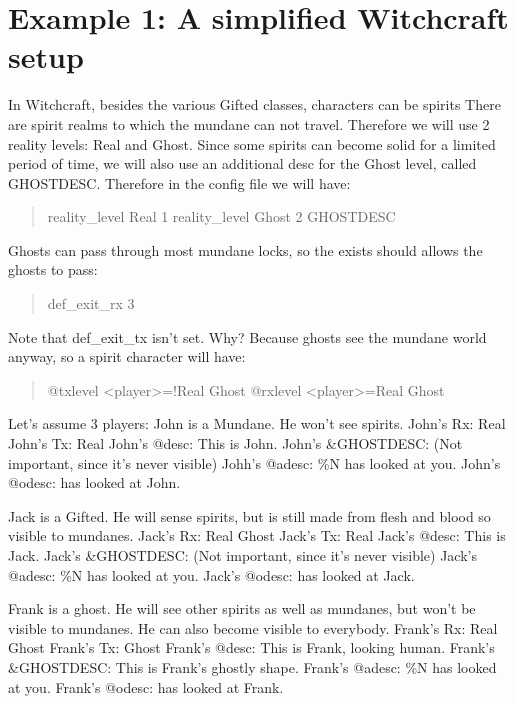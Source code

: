 \documentclass[letterpaper,10pt,english]{sphinxmanual}
\begin{document}
\section{Example 1: A simplified Witchcraft setup}
\label{\detokenize{19-reality:example-1-a-simplified-witchcraft-setup}}
\sphinxAtStartPar
In Witchcraft, besides the various Gifted classes, characters can be spirits
There are spirit realms to which the mundane can not travel. Therefore we
will use 2 reality levels: Real and Ghost. Since some spirits can become
solid for a limited period of time, we will also use an additional desc for
the Ghost level, called GHOSTDESC. Therefore in the config file we will
have:
\begin{quote}

\sphinxAtStartPar
reality\_level Real 1
reality\_level Ghost 2 GHOSTDESC
\end{quote}

\sphinxAtStartPar
Ghosts can pass through most mundane locks, so the exists should allows the
ghosts to pass:
\begin{quote}

\sphinxAtStartPar
def\_exit\_rx 3
\end{quote}

\sphinxAtStartPar
Note that def\_exit\_tx isn’t set. Why? Because ghosts see the mundane world
anyway, so a spirit character will have:
\begin{quote}

\sphinxAtStartPar
@txlevel \textless{}player\textgreater{}=!Real Ghost
@rxlevel \textless{}player\textgreater{}=Real Ghost
\end{quote}

\sphinxAtStartPar
Let’s assume 3 players:
John is a Mundane. He won’t see spirits.
John’s Rx: Real
John’s Tx: Real
John’s @desc: This is John.
John’s \&GHOSTDESC: (Not important, since it’s never visible)
Johh’s @adesc: \%N has looked at you.
John’s @odesc: has looked at John.

\sphinxAtStartPar
Jack is a Gifted. He will sense spirits, but is still made from flesh
and blood so visible to mundanes.
Jack’s Rx: Real Ghost
Jack’s Tx: Real
Jack’s @desc: This is Jack.
Jack’s \&GHOSTDESC: (Not important, since it’s never visible)
Jack’s @adesc: \%N has looked at you.
Jack’s @odesc: has looked at Jack.

\sphinxAtStartPar
Frank is a ghost. He will see other spirits as well as mundanes, but won’t
be visible to mundanes. He can also become visible to everybody.
Frank’s Rx: Real Ghost
Frank’s Tx: Ghost
Frank’s @desc: This is Frank, looking human.
Frank’s \&GHOSTDESC: This is Frank’s ghostly shape.
Frank’s @adesc: \%N has looked at you.
Frank’s @odesc: has looked at Frank.
\end{document}
